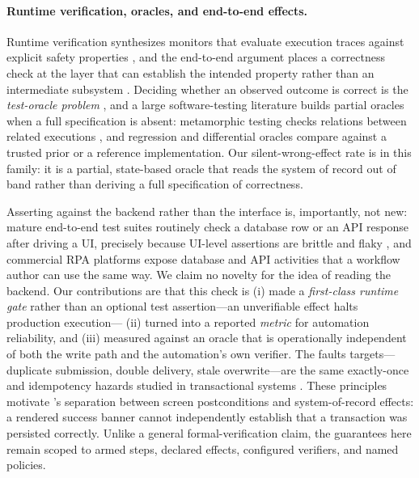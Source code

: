 \paragraph{Runtime verification, oracles, and end-to-end effects.}
Runtime verification synthesizes monitors that evaluate execution traces
against explicit safety properties \cite{havelund2002synthesizing}, and the
end-to-end argument places a correctness check at the layer that can establish
the intended property rather than an intermediate subsystem \cite{saltzer1984end}.
Deciding whether an observed outcome is correct is the \emph{test-oracle problem}
\cite{barr2015oracle}, and a large software-testing literature builds partial
oracles when a full specification is absent: metamorphic testing checks relations
between related executions \cite{chen2018metamorphic}, and regression and
differential oracles compare against a trusted prior or a reference
implementation. Our silent-wrong-effect rate is in this family: it is a partial,
state-based oracle that reads the system of record out of band rather than
deriving a full specification of correctness.

Asserting against the backend rather than the interface is, importantly, not
new: mature end-to-end test suites routinely check a database row or an API
response after driving a UI, precisely because UI-level assertions are brittle
and flaky \cite{leotta2013capture,luo2014flaky}, and commercial RPA platforms
expose database and API activities that a workflow author can use the same way.
We claim no novelty for the idea of reading the backend. Our contributions are
that this check is (i) made a \emph{first-class runtime gate} rather than an
optional test assertion---an unverifiable effect halts production execution---
(ii) turned into a reported \emph{metric} for automation reliability, and (iii)
measured against an oracle that is operationally independent of both the write
path and the automation's own verifier. The faults \system{} targets---
duplicate submission, double delivery, stale overwrite---are the same
exactly-once and idempotency hazards studied in transactional systems
\cite{gray1981transaction}. These
principles motivate \system{}'s separation between screen postconditions and
system-of-record effects: a rendered success banner cannot independently
establish that a transaction was persisted correctly. Unlike a general
formal-verification claim, the guarantees here remain scoped to armed steps,
declared effects, configured verifiers, and named policies.

